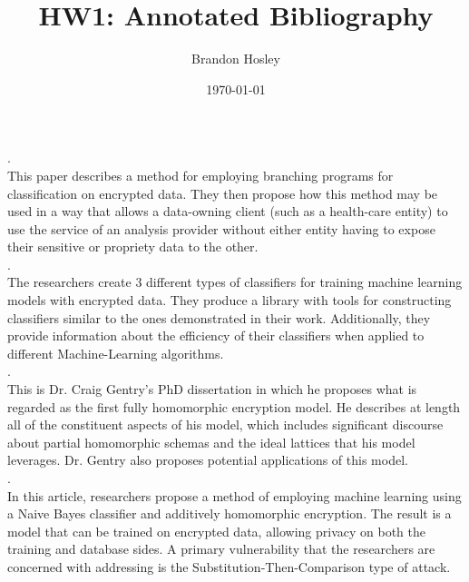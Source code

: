 \documentclass[]{article}
\title{HW1: Annotated Bibliography}
\author{Brandon Hosley}
\date{\today}
\begin{document}
	\maketitle
	
	\pagebreak
	
	
	.
	\vspace{1em}\\
	This paper describes a method for employing branching programs for classification on encrypted data. They then propose how this method may be used in a way that allows a data-owning client (such as a health-care entity) to use the service of an analysis provider without either entity having to expose their sensitive or propriety data to the other.
	\vspace{1em}\\

	.	
	\vspace{1em}\\ 
	The researchers create 3 different types of classifiers for training machine learning models with encrypted data. They produce a library with tools for constructing classifiers similar to the ones demonstrated in their work. Additionally, they provide information about the efficiency of their classifiers when applied to different Machine-Learning algorithms.
	\vspace{1em}\\
	
	.
	\vspace{1em}\\
	This is Dr. Craig Gentry's PhD dissertation in which he proposes what is regarded as the first fully homomorphic encryption model. He describes at length all of the constituent aspects of his model, which includes significant discourse about partial homomorphic schemas and the ideal lattices that his model leverages. Dr. Gentry also proposes potential applications of this model.
	\vspace{1em}\\
	
	.
	\vspace{1em}\\
	In this article, researchers propose a method of employing machine learning using a Naive Bayes classifier and additively homomorphic encryption. The result is a model that can be trained on encrypted data, allowing privacy on both the training and database sides. A primary vulnerability that the researchers are concerned with addressing is the  Substitution-Then-Comparison type of attack. 
	\vspace{1em}\\	
	
\end{document}

